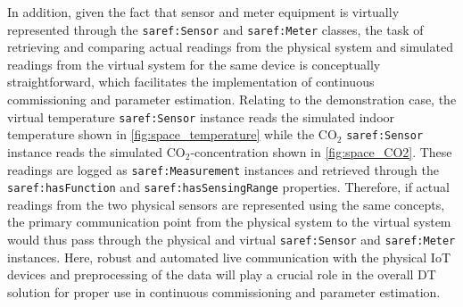 In addition, given the fact that sensor and meter equipment is virtually represented through the \texttt{saref:Sensor} and \texttt{saref:Meter} classes, the task of retrieving and comparing actual readings from the physical system and simulated readings from the virtual system for the same device is conceptually straightforward, which facilitates the implementation of continuous commissioning and parameter estimation. Relating to the demonstration case, the virtual temperature \texttt{saref:Sensor} instance reads the simulated indoor temperature shown in \autoref{fig:space_temperature} while the CO$_2$  \texttt{saref:Sensor} instance reads the simulated CO$_2$-concentration shown in \autoref{fig:space_CO2}. These readings are logged as \texttt{saref:Measurement} instances and retrieved through the \texttt{saref:hasFunction} and \texttt{saref:hasSensingRange} properties. 
Therefore, if actual readings from the two physical sensors are represented using the same concepts, the primary communication point from the physical system to the virtual system would thus pass through the physical and virtual \texttt{saref:Sensor} and \texttt{saref:Meter} instances. Here, robust and automated live communication with the physical IoT devices and preprocessing of the data will play a crucial role in the overall DT solution for proper use in continuous commissioning and parameter estimation. 


















